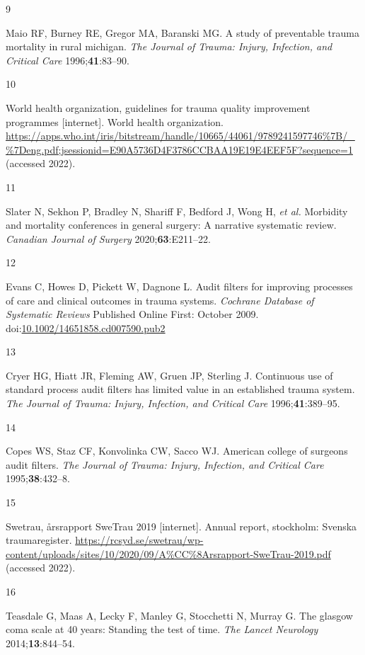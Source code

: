 \documentclass[
]{article}
\newlength{\cslhangindent}
\newlength{\csllabelwidth}
\newlength{\cslentryspacingunit} %
\newenvironment{CSLReferences}[2] %
 {%
  \setlength{\parindent}{0pt}
  \ifodd #1
  \let\oldpar\par
  \def\par{\hangindent=\cslhangindent\oldpar}
  \fi
  \setlength{\parskip}{#2\cslentryspacingunit}
 }%
 {}
\newcommand{\CSLLeftMargin}[1]{\parbox[t]{\csllabelwidth}{#1}}
\newcommand{\CSLRightInline}[1]{\parbox[t]{\linewidth - \csllabelwidth}{#1}\break}
\begin{document}
\begin{CSLReferences}{0}{0}
\leavevmode{}%
\CSLLeftMargin{9 }
\CSLRightInline{Maio RF, Burney RE, Gregor MA, Baranski MG. A study of
preventable trauma mortality in rural michigan. \emph{The Journal of
Trauma: Injury, Infection, and Critical Care} 1996;\textbf{41}:83--90.}

\leavevmode{}%
\CSLLeftMargin{10 }
\CSLRightInline{World health organization, guidelines for trauma quality
improvement programmes {[}internet{]}. World health organization.
\url{https://apps.who.int/iris/bitstream/handle/10665/44061/9789241597746\%7B/_\%7Deng.pdf;jsessionid=E90A5736D4F3786CCBAA19E19E4EEF5F?sequence=1}
(accessed 2022).}

\leavevmode{}%
\CSLLeftMargin{11 }
\CSLRightInline{Slater N, Sekhon P, Bradley N, Shariff F, Bedford J,
Wong H, \emph{et al.} Morbidity and mortality conferences in general
surgery: A narrative systematic review. \emph{Canadian Journal of
Surgery} 2020;\textbf{63}:E211--22.}

\leavevmode{}%
\CSLLeftMargin{12 }
\CSLRightInline{Evans C, Howes D, Pickett W, Dagnone L. Audit filters
for improving processes of care and clinical outcomes in trauma systems.
\emph{Cochrane Database of Systematic Reviews} Published Online First:
October 2009.
doi:\href{https://doi.org/10.1002/14651858.cd007590.pub2}{10.1002/14651858.cd007590.pub2}}

\leavevmode{}%
\CSLLeftMargin{13 }
\CSLRightInline{Cryer HG, Hiatt JR, Fleming AW, Gruen JP, Sterling J.
Continuous use of standard process audit filters has limited value in an
established trauma system. \emph{The Journal of Trauma: Injury,
Infection, and Critical Care} 1996;\textbf{41}:389--95.}

\leavevmode{}%
\CSLLeftMargin{14 }
\CSLRightInline{Copes WS, Staz CF, Konvolinka CW, Sacco WJ. American
college of surgeons audit filters. \emph{The Journal of Trauma: Injury,
Infection, and Critical Care} 1995;\textbf{38}:432--8.}

\leavevmode{}%
\CSLLeftMargin{15 }
\CSLRightInline{Swetrau, årsrapport SweTrau 2019 {[}internet{]}. Annual
report, stockholm: Svenska traumaregister.
\url{https://rcsyd.se/swetrau/wp-content/uploads/sites/10/2020/09/A\%CC\%8Arsrapport-SweTrau-2019.pdf}
(accessed 2022).}

\leavevmode{}%
\CSLLeftMargin{16 }
\CSLRightInline{Teasdale G, Maas A, Lecky F, Manley G, Stocchetti N,
Murray G. The glasgow coma scale at 40 years: Standing the test of time.
\emph{The Lancet Neurology} 2014;\textbf{13}:844--54.}

\end{CSLReferences}
\end{document}
